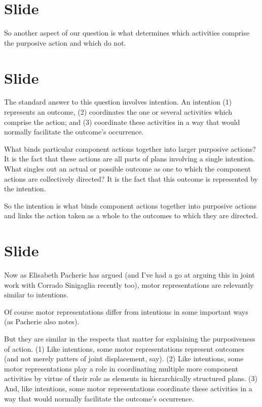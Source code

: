 \documentclass[12pt,\papersize]{extarticle}
\begin{document}
\section{Slide}
So another aspect of our question is what determines which activities comprise the purposive action and which do not.





\section{Slide}
The standard answer to this question involves intention.
An intention (1) represents an outcome, (2) coordinates the one or several activities which comprise the action; and (3) coordinate these activities in a way that would normally facilitate the outcome’s occurrence.

What binds particular component actions together into larger purposive actions?  It is the fact that these actions are all parts of plans involving a single intention.
What singles out an actual or possible outcome as one to which the component actions are collectively directed?  It is the fact that this outcome is represented by the intention.

So the intention is what binds component actions together into purposive actions and links the action taken as a whole to the outcomes to which they are directed.



\section{Slide}
Now as Elisabeth Pacherie has argued \citep[pp.\ 189-90]{pacherie:2008_action} (and I’ve had a go at arguing this in joint work with Corrado Sinigaglia recently too),
motor representations are relevantly similar to intentions.

Of course motor representations differ from intentions in some important ways (as Pacherie also notes).

But they are similar in the respects that matter for explaining the purposiveness of action.
(1) Like intentions, some motor representations represent outcomes (and not merely patters of joint displacement, say).
(2) Like intentions, some motor representations play a role in coordinating multiple more component activities by virtue of their role as elements in hierarchically structured plans.
(3) And, like intentions, some motor representations coordinate these activities in a way that would normally facilitate the outcome’s occurrence.
\end{document}
